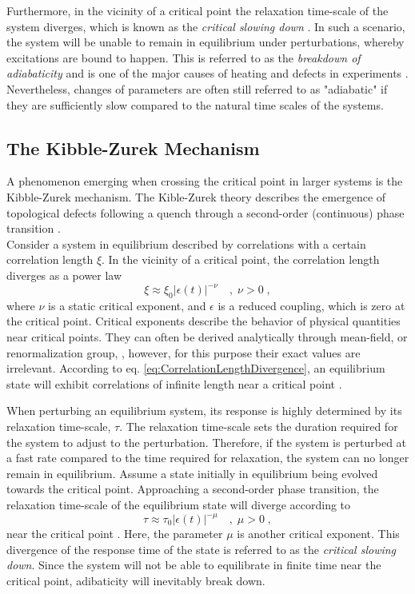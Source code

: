 Furthermore, in the vicinity of a critical point the relaxation time-scale of the system diverges, which is known as the \textit{critical slowing down} \cite{Zurek2005}. In such a scenario, the system will be unable to remain in equilibrium under perturbations, whereby excitations are bound to happen. This is referred to as the \textit{breakdown of adiabaticity} and is one of the major causes of heating and defects in experiments \cite{Zakrzewski2009}. Nevertheless, changes of parameters are often still referred to as "adiabatic" if they are sufficiently slow compared to the natural time scales of the systems.


\subsection{The Kibble-Zurek Mechanism}
A phenomenon emerging when crossing the critical point in larger systems is the Kibble-Zurek mechanism. The Kible-Zurek theory describes the emergence of topological defects following a quench through a second-order (continuous) phase transition \cite{Zurek2005}.\\

Consider a system in equilibrium described by correlations with a certain correlation length $\xi$. In the vicinity of a critical point, the correlation length diverges as a power law
\begin{equation}
	\xi  \approx \xi_0 |\epsilon (t)|^{-\nu} \quad , \; \nu > 0 \; ,
	\label{eq:CorrelationLengthDivergence}
\end{equation} 
where $\nu$ is a static critical exponent, and $\epsilon$ is a reduced coupling, which is zero at the critical point. Critical exponents describe the behavior of physical quantities near critical points. They can often be derived analytically through mean-field, or renormalization group, \cite{Stanley1971}, however, for this purpose their exact values are irrelevant. 
According to eq. \eqref{eq:CorrelationLengthDivergence}, an equilibrium state will exhibit correlations of infinite length near a critical point \cite{Kibble1976}.

When perturbing an equilibrium system, its response is highly determined by its relaxation time-scale, $\tau$. The relaxation time-scale sets the duration required for the system to adjust to the perturbation. Therefore, if the system is perturbed at a fast rate compared to the time required for relaxation, the system can no longer remain in equilibrium.
Assume a state initially in equilibrium being evolved towards the critical point. Approaching a second-order phase transition, the relaxation time-scale of the equilibrium state will diverge according to
\begin{equation}
	\tau \approx \tau_0 |\epsilon (t)|^{-\mu} \quad , \; \mu > 0 \; ,
\end{equation}
near the critical point \cite{Zurek2005}. Here, the parameter $\mu$ is another critical exponent. This divergence of the response time of the state is referred to as the \textit{critical slowing down}. Since the system will not be able to equilibrate in finite time near the critical point, adibaticity will inevitably break down. 

